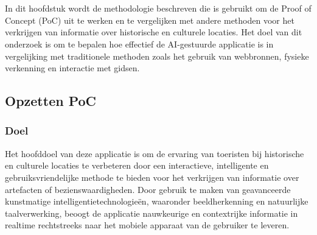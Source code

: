 
\chapter{}%
\label{ch:methodologie}


In dit hoofdstuk wordt de methodologie beschreven die is gebruikt om de Proof of Concept (PoC) uit te werken en te vergelijken met andere methoden voor het verkrijgen van informatie over historische en culturele locaties. Het doel van dit onderzoek is om te bepalen hoe effectief de AI-gestuurde applicatie is in vergelijking met traditionele methoden zoals het gebruik van webbronnen, fysieke verkenning en interactie met gidsen.

\section{Opzetten PoC}

\subsection{Doel}
Het hoofddoel van deze applicatie is om de ervaring van toeristen bij historische en culturele locaties te verbeteren door een interactieve, intelligente en gebruiksvriendelijke methode te bieden voor het verkrijgen van informatie over artefacten of bezienswaardigheden. Door gebruik te maken van geavanceerde kunstmatige intelligentietechnologieën, waaronder beeldherkenning en natuurlijke taalverwerking, beoogt de applicatie nauwkeurige en contextrijke informatie in realtime rechtstreeks naar het mobiele apparaat van de gebruiker te leveren.

